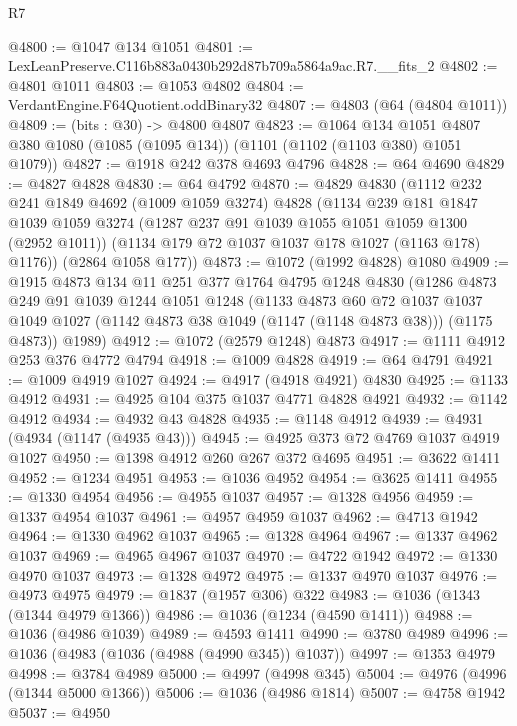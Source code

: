 \begin{lexlean}{R7}
\begin{coremodule}
@4800 := @1047 @134 @1051
@4801 := LexLeanPreserve.C116b883a0430b292d87b709a5864a9ac.R7.__fits_2
@4802 := @4801 @1011
@4803 := @1053 @4802
@4804 := VerdantEngine.F64Quotient.oddBinary32
@4807 := @4803 (@64 (@4804 @1011))
@4809 := (bits : @30) -> @4800 @4807
@4823 := @1064
    @134
    @1051
    @4807
    @380
    @1080
    (@1085 (@1095 @134))
    (@1101 (@1102 (@1103 @380) @1051 @1079))
@4827 := @1918 @242 @378 @4693 @4796
@4828 := @64 @4690
@4829 := @4827 @4828
@4830 := @64 @4792
@4870 := @4829
    @4830
    (@1112
      @232
      @241
      @1849
      @4692
      (@1009 @1059 @3274)
      @4828
      (@1134
        @239
        @181
        @1847
        @1039
        @1059
        @3274
        (@1287 @237 @91 @1039 @1055 @1051 @1059 @1300 (@2952 @1011))
        (@1134 @179 @72 @1037 @1037 @178 @1027 (@1163 @178) @1176))
      (@2864 @1058 @177))
@4873 := @1072 (@1992 @4828) @1080
@4909 := @1915
    @4873
    @134
    @11
    @251
    @377
    @1764
    @4795
    @1248
    @4830
    (@1286
      @4873
      @249
      @91
      @1039
      @1244
      @1051
      @1248
      (@1133
        @4873
        @60
        @72
        @1037
        @1037
        @1049
        @1027
        (@1142 @4873 @38 @1049 (@1147 (@1148 @4873 @38)))
        (@1175 @4873))
      @1989)
@4912 := @1072 (@2579 @1248) @4873
@4917 := @1111 @4912 @253 @376 @4772 @4794
@4918 := @1009 @4828
@4919 := @64 @4791
@4921 := @1009 @4919 @1027
@4924 := @4917 (@4918 @4921) @4830
@4925 := @1133 @4912
@4931 := @4925 @104 @375 @1037 @4771 @4828 @4921
@4932 := @1142 @4912
@4934 := @4932 @43 @4828
@4935 := @1148 @4912
@4939 := @4931 (@4934 (@1147 (@4935 @43)))
@4945 := @4925 @373 @72 @4769 @1037 @4919 @1027
@4950 := @1398 @4912 @260 @267 @372 @4695
@4951 := @3622 @1411
@4952 := @1234 @4951
@4953 := @1036 @4952
@4954 := @3625 @1411
@4955 := @1330 @4954
@4956 := @4955 @1037
@4957 := @1328 @4956
@4959 := @1337 @4954 @1037
@4961 := @4957 @4959 @1037
@4962 := @4713 @1942
@4964 := @1330 @4962 @1037
@4965 := @1328 @4964
@4967 := @1337 @4962 @1037
@4969 := @4965 @4967 @1037
@4970 := @4722 @1942
@4972 := @1330 @4970 @1037
@4973 := @1328 @4972
@4975 := @1337 @4970 @1037
@4976 := @4973 @4975
@4979 := @1837 (@1957 @306) @322
@4983 := @1036 (@1343 (@1344 @4979 @1366))
@4986 := @1036 (@1234 (@4590 @1411))
@4988 := @1036 (@4986 @1039)
@4989 := @4593 @1411
@4990 := @3780 @4989
@4996 := @1036 (@4983 (@1036 (@4988 (@4990 @345)) @1037))
@4997 := @1353 @4979
@4998 := @3784 @4989
@5000 := @4997 (@4998 @345)
@5004 := @4976 (@4996 (@1344 @5000 @1366))
@5006 := @1036 (@4986 @1814)
@5007 := @4758 @1942
@5037 := @4950

\end{coremodule}
\end{lexlean}
